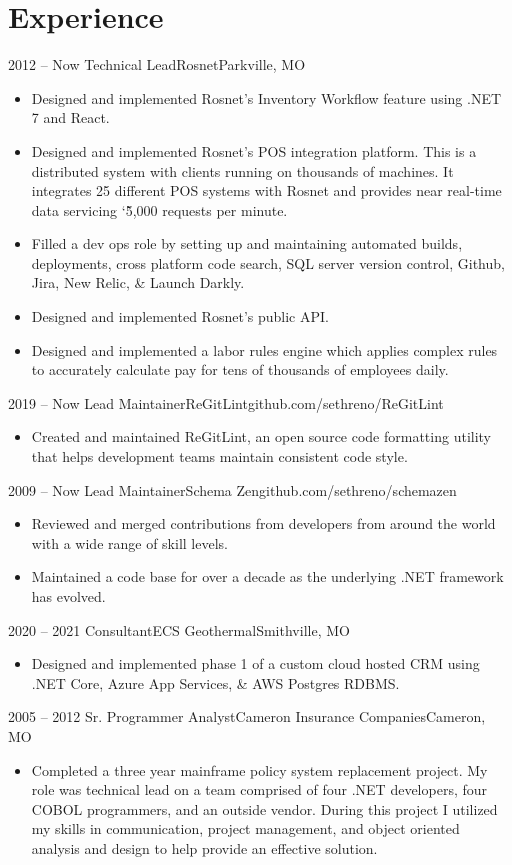 \documentclass[11pt,letterpaper,final]{moderncv}
\begin{document}
\section{Experience} 
	\cventry
{2012 -- Now} {Technical Lead}{Rosnet}{Parkville, MO}{}{
		\begin{itemize}
			\item
				Designed and implemented Rosnet's Inventory Workflow
				feature using .NET 7 and React.
			\item
				Designed and implemented Rosnet's POS integration
				platform. This is a distributed system with clients
				running on thousands of machines. It integrates 25
				different POS systems with Rosnet and provides near
				real-time data servicing \char`\~5,000 requests per
				minute.
			\item
				Filled a dev ops role by setting up and maintaining
				automated builds, deployments, cross platform code
				search, SQL server version control, Github, Jira,
				New Relic, \& Launch Darkly.
			\item
				Designed and implemented Rosnet's public API.
			\item
				Designed and implemented a labor rules engine which
				applies complex rules to accurately calculate pay for
				tens of thousands of employees daily.
		\end{itemize}
}
	\cventry
{2019 -- Now} {Lead Maintainer}{ReGitLint}{github.com/sethreno/ReGitLint}{}{
		\begin{itemize}
			\item 
				Created and maintained ReGitLint, an open source code formatting
				utility that helps development teams maintain consistent code
				style.
		\end{itemize}
}
	\cventry
{2009 -- Now} {Lead Maintainer}{Schema Zen}{github.com/sethreno/schemazen}{}{
		\begin{itemize}
			\item 
				Reviewed and merged contributions from developers from around the world
				with a wide range of skill levels.
			\item 
				Maintained a code base for over a decade as the underlying .NET
				framework has evolved.
		\end{itemize}
}
	\cventry
{2020 -- 2021} {Consultant}{ECS Geothermal}{Smithville, MO}{}{
		\begin{itemize}
			\item 
				Designed and implemented phase 1 of a custom cloud hosted CRM
				using .NET Core, Azure App Services, \& AWS Postgres RDBMS.
		\end{itemize}
}
	\cventry
{2005 -- 2012} {Sr. Programmer Analyst}{Cameron Insurance Companies}{Cameron, MO}{}{
		\begin{itemize}
			\item 
				Completed a three year mainframe policy system
				replacement project. My role was technical lead on a
				team comprised of four .NET developers, four COBOL
				programmers, and an outside vendor. During this project
				I utilized my skills in communication, project
				management, and object oriented analysis and design to
				help provide an effective solution.
		\end{itemize}
}
\end{document}
